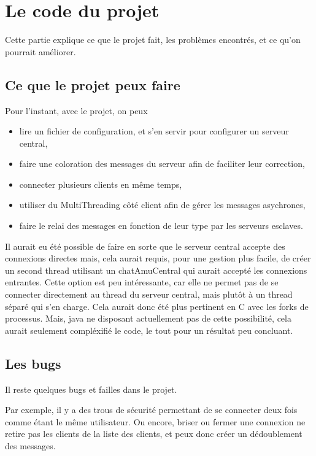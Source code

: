 \section{Le code du projet}
Cette partie explique ce que le projet fait, les problèmes encontrés, et ce qu'on pourrait améliorer.

\subsection{Ce que le projet peux faire}
Pour l'instant, avec le projet, on peux
\begin{itemize}
	\item lire un fichier de configuration, et s'en servir pour configurer un serveur central,
	\item faire une coloration des messages du serveur afin de faciliter leur correction,
	\item connecter plusieurs clients en même temps,
	\item utiliser du MultiThreading côté client afin de gérer les messages asychrones,
	\item faire le relai des messages en fonction de leur type par les serveurs esclaves.
\end{itemize}

Il aurait eu été possible de faire en sorte que le serveur central accepte des connexions directes mais, cela aurait requis, pour une gestion plus facile, de créer un second thread utilisant un chatAmuCentral qui aurait accepté les connexions entrantes.
Cette option est peu intéressante, car elle ne permet pas de se connecter directement au thread du serveur central, mais plutôt à un thread séparé qui s'en charge.
Cela aurait donc été plus pertinent en C avec les forks de processus. Mais, java ne disposant actuellement pas de cette possibilité, cela aurait seulement compléxifié le code, le tout pour un résultat peu concluant.

\subsection{Les bugs}
Il reste quelques bugs et failles dans le projet.

Par exemple, il y a des trous de sécurité permettant de se connecter deux fois comme étant le même utilisateur.
Ou encore, briser ou fermer une connexion ne retire pas les clients de la liste des clients, et peux donc créer un dédoublement des messages.

